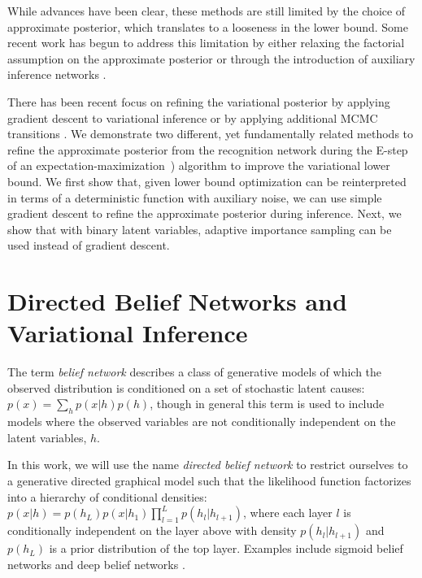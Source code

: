 \documentclass{article} %
\begin{document}
While advances have been clear, these methods are still limited by the choice
of approximate posterior, which translates to a looseness in the lower bound.
Some recent work has begun to address this limitation by either relaxing the
factorial assumption \citep{burda2015importance} on the approximate posterior or
through the introduction of auxiliary inference networks
\citep{rezende2015variational}.

There has been recent focus on
refining the variational posterior by applying gradient descent to variational
inference \citep{hoffman2013stochastic} or by applying additional MCMC
transitions \citep{icml2015_salimans15}. We demonstrate two different, yet fundamentally related methods to
refine the approximate posterior from the recognition network during the E-step
of an expectation-maximization~\citep[EM,][]{dempster1977maximum, neal1998view})
algorithm to improve the variational lower bound. 
We first show that, given lower bound optimization can be
reinterpreted in terms of a deterministic function with auxiliary noise, we can use simple gradient descent
to refine the approximate posterior during inference. Next, we show that with
binary latent variables, adaptive importance sampling
\citep[AdIS][]{oh1992adaptive} can be used instead of gradient descent.

\section{Directed Belief Networks and Variational Inference}

The term \emph{belief network} describes a class of generative models of which
the observed distribution is conditioned on a set of stochastic latent causes:
$p(x) = \sum_h p(x|h) p(h)$, though in general this term is used to include
models where the observed variables are not conditionally independent on the
latent variables, $h$. 

In this work, we will use the name \emph{directed belief network} to restrict
ourselves to a generative directed graphical model such that the likelihood
function factorizes into a hierarchy of conditional densities: $p(x | h) =
p(h_L) p(x|h_1) \prod_{l=1}^L p(h_{l}|h_{l+1})$, where each layer $l$ is
conditionally independent on the layer above with density $p(h_{l}|h_{l + 1})$
and $p(h_L)$ is a prior distribution of the top layer. Examples include sigmoid
belief networks \citep[SBN,][]{neal1992connectionist} and deep belief networks
\citep[DBN,][]{hinton2006fast}.
\end{document}
